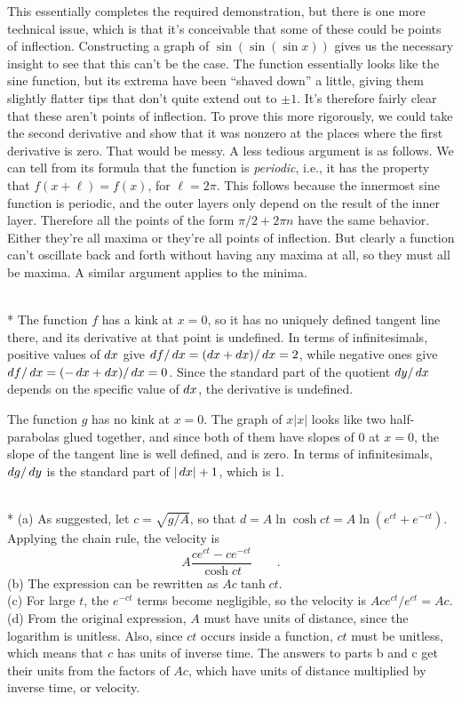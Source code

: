 This essentially completes the required demonstration, but there is one more technical issue, which
is that it's conceivable that some of these could
be points of inflection. Constructing a graph of $\sin(\sin(\sin x))$ gives us the necessary
insight to see that this can't be the case. The function essentially looks like the sine function, but
its extrema have been ``shaved down'' a little, giving them slightly flatter tips that don't quite extend
out to $\pm 1$. It's therefore fairly clear that these aren't points of inflection.
To prove this more rigorously, we could take the second derivative and show that it was
nonzero at the places where the first derivative is zero. That would be messy. A less tedious argument is
as follows. We can tell from its formula that the function is \emph{periodic}, i.e., it has the property that
$f(x+\ell)=f(x)$, for $\ell=2\pi$. This follows because the innermost sine function is periodic, and the outer layers only
depend on the result of the inner layer. Therefore all the points of the form $\pi/2+2\pi n$
have the same behavior. Either they're all maxima or they're all points of inflection. But clearly a
function can't oscillate back and forth without having any maxima at all, so they must all be maxima. A
similar argument applies to the minima.


\\*
The function $f$ has a kink at $x=0$, so it has no uniquely defined tangent line there, and its derivative
at that point is undefined. In terms of infinitesimals, positive values of $\mathop{d\!} x$ give
$\mathop{d\!} f/\mathop{d\!} x=(\mathop{d\!} x+\mathop{d\!} x)/\mathop{d\!} x=2$, while negative ones give $\mathop{d\!} f/\mathop{d\!} x=(-\mathop{d\!} x+\mathop{d\!} x)/\mathop{d\!} x=0$.
Since the standard part of the quotient $\mathop{d\!} y/\mathop{d\!} x$ depends on the specific value of $\mathop{d\!} x$, the derivative is
undefined.

The function $g$ has no kink at $x=0$. The graph of $x|x|$ looks like two half-parabolas glued together, and since
both of them have slopes of 0 at $x=0$, the slope of the tangent line is well defined, and is zero. In terms of
infinitesimals, $\mathop{d\!} g/\mathop{d\!} y$ is the standard part of $|\mathop{d\!} x|+1$, which is 1.

\\*
(a) As suggested, let $c=\sqrt{g/A}$, so that  $d = A \ln\cosh ct=A\ln\left(e^{ct}+e^{-ct}\right)$.
Applying the chain rule, the velocity is
\begin{equation*}
  A\frac{ce^{ct}-ce^{-ct}}{\cosh ct} \qquad .
\end{equation*}
(b) The expression can be rewritten as $Ac\tanh ct$.\\
(c) For large $t$, the $e^{-ct}$ terms become negligible, so the velocity is $Ace^{ct}/e^{ct}=Ac$.
(d) From the original expression, $A$ must have units of distance, since the logarithm is unitless.
Also, since $ct$ occurs inside a function, $ct$ must be unitless, which means that $c$ has units
of inverse time. The answers to parts b and c get their units from the factors of $Ac$, which have
units of distance multiplied by inverse time, or velocity.

